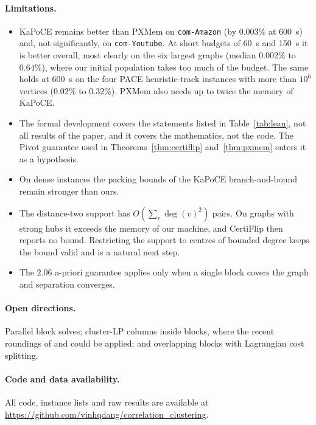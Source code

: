 \documentclass[11pt]{article}
\theoremstyle{definition}
\begin{document}
\paragraph{Limitations.}
\begin{itemize}
\item KaPoCE remains better than PXMem on \texttt{com-Amazon} (by $0.003\%$ at
\SI{600}{s}) and, not significantly, on \texttt{com-Youtube}.  At short
budgets of \SI{60}{s} and \SI{150}{s} it is better overall, most clearly on
the six largest graphs (median $0.002\%$ to $0.64\%$), where our initial
population takes too much of the budget.  The same holds at
\SI{600}{s} on the four PACE heuristic-track instances with more than
$10^6$ vertices ($0.02\%$ to $0.32\%$).  PXMem also needs up to twice the memory of KaPoCE.
\item The formal development covers the statements listed in
Table~\ref{tab:lean}, not all results of the paper, and it covers the
mathematics, not the code.  The Pivot guarantee used in
Theorems~\ref{thm:certiflip} and~\ref{thm:pxmem} enters it as a hypothesis.
\item On dense instances the packing bounds of the KaPoCE branch-and-bound
remain stronger than ours.
\item The distance-two support has $O(\sum_v\deg(v)^2)$ pairs.  On graphs
with strong hubs it exceeds the memory of our machine, and CertiFlip then
reports no bound.  Restricting the support to centres of bounded degree keeps
the bound valid and is a natural next step.
\item The $2.06$ a-priori guarantee applies only when a single block covers
the graph and separation converges.
\end{itemize}

\paragraph{Open directions.}  Parallel block solves; cluster-LP columns
inside blocks, where the recent roundings of \citet{CaoCLLNV24} and
\citet{GarciaSorianoS26} could be applied; and overlapping blocks with
Lagrangian cost splitting.

\paragraph{Code and data availability.}  All code, instance lists and raw
results are available at
\url{https://github.com/vinhqdang/correlation_clustering}.



\end{document}
